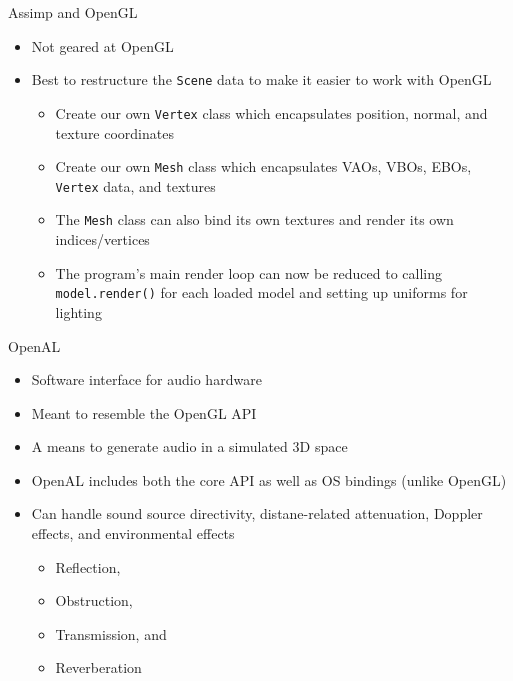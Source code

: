 \documentclass{beamer}
\begin{document}
\begin{frame}[fragile]{Assimp and OpenGL}
    \begin{itemize}
        \item Not geared at OpenGL
        \item Best to restructure the {\color{blue}\verb"Scene"} data to make it easier to work with OpenGL
        \begin{itemize}
            \item Create our own {\color{blue}\verb"Vertex"} class which encapsulates position, normal, and texture
                coordinates
            \item Create our own {\color{blue}\verb"Mesh"} class which encapsulates VAOs, VBOs, EBOs,
                {\color{blue}\verb"Vertex"} data, and textures
            \item The {\color{blue}\verb"Mesh"} class can also bind its own textures and render its own indices/vertices
            \item The program's main render loop can now be reduced to calling {\color{blue}\verb"model.render()"} for
                each loaded model and setting up uniforms for lighting
        \end{itemize}
    \end{itemize}
\end{frame}

\begin{frame}[fragile]{OpenAL}
    \begin{itemize}
        \item Software interface for audio hardware
        \item Meant to resemble the OpenGL API
        \item A means to generate audio in a simulated 3D space
        \item OpenAL includes both the core API as well as OS bindings (unlike OpenGL)
        \item Can handle sound source directivity, distane-related attenuation, Doppler effects, and environmental
            effects
        \begin{itemize}
            \item Reflection,
            \item Obstruction,
            \item Transmission, and
            \item Reverberation
        \end{itemize}
    \end{itemize}
\end{frame}
\end{document}
